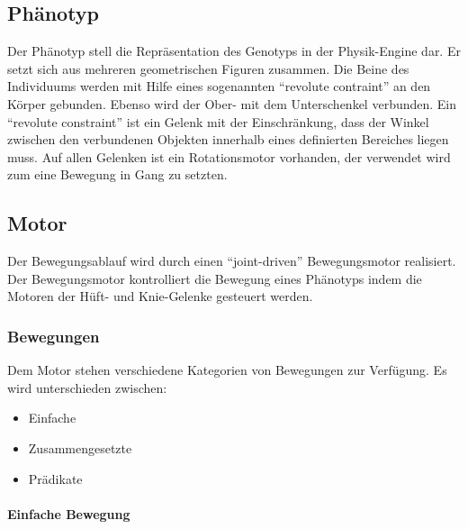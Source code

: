     \subsection{Phänotyp\label{sub:Phenotyp}}

      Der Phänotyp stell die Repräsentation des Genotyps in der Physik-Engine dar.
      Er setzt sich aus mehreren geometrischen Figuren zusammen.
      Die Beine des Individuums werden mit Hilfe eines sogenannten ``revolute contraint'' an den Körper gebunden.
      Ebenso wird der Ober- mit dem Unterschenkel verbunden.
      Ein ``revolute constraint'' ist ein Gelenk mit der Einschränkung,
      dass der Winkel zwischen den verbundenen Objekten innerhalb eines definierten Bereiches liegen muss.
      Auf allen Gelenken ist ein Rotationsmotor vorhanden, der verwendet wird zum eine Bewegung in Gang zu setzten.

    \subsection{Motor\label{sub:Engine}}


      Der Bewegungsablauf wird durch einen ``joint-driven'' Bewegungsmotor realisiert.
      Der Bewegungsmotor kontrolliert die Bewegung eines Phänotyps indem die Motoren der Hüft- und
      Knie-Gelenke gesteuert werden.

      \subsubsection{Bewegungen\label{subsub:EngineMovements}}

        Dem Motor stehen verschiedene Kategorien von Bewegungen zur Verfügung.
        Es wird unterschieden zwischen:

        \begin{itemize}
          \item Einfache
          \item Zusammengesetzte
          \item Prädikate
        \end{itemize}

        \paragraph{Einfache Bewegung\label{EngineMovementsSimple}}

